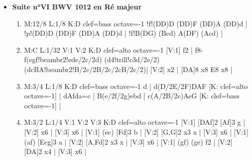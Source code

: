 \documentclass[a4paper,twoside]{article}
\begin{document}
\begin{center}
\begin{itemize}
  \item \textbf{Suite n°VI BWV 1012 en Ré majeur} \dotfill\ \pageref{SuiteVI}
\begin{enumerate}
  \item {}
\begin{abcsvg}
  M:12/8
  L:1/8
  K:D clef=bass octave=-1
  !f!(DD)D (DD)F (DD)A (DD)d |
  !p!(DD)D (DD)F (DD)A (DD)d |
  !f!B(DG) (Bcd) A(DF) (Acd) |
\end{abcsvg}
  \makebox[2cm][l]{ \dotfill\ \pageref{VIprelude}}
  \par\vspace{\titleseplen}

  \item {}
\begin{abcsvg}
  M:C
  L:1/32
  V:1
  V:2
  K:D clef=alto octave=-1
  [V:1] f2 | f8- f(egf!beambr2!ede/2c/2d) (d4!trill!c3d/2e/2) (dcBA!beambr2!B/2c/2B/2c/2cB/2c/2)|
  [V:2] x2 | [DA]8 x8             E8                    x8    |
\end{abcsvg}
  \makebox[2cm][l]{ \dotfill\ \pageref{VIallemande}}
  \par\vspace{\titleseplen}

  \item {}
\begin{abcsvg}
  M:3/4
  L:1/8
  K:D clef=bass octave=-1
  d | d(D/2E/2F)DAF [K: clef=alto octave=-1] |
  dAfda=c |
  B(e/2f/2g)ebd |
  c(A/2B/2c)AeG [K: clef=bass octave=-1] |
\end{abcsvg}
  \makebox[2cm][l]{ \dotfill\ \pageref{VIcourante}}
  \par\vspace{\titleseplen}

  \item {}
\begin{abcsvg}
  M:3/2
  L:1/4
  V:1
  V:2
  V:3
  K:D clef=alto octave=-1
  [V:1] [DAf]2 [Af]3 g |
  [V:2] x6 |
  [V:3] x6 |
  [V:1] (ec)   [Fd]3 b |
  [V:2] [G,G]2  x3 x |
  [V:3] x6 |
  [V:1] (af) [Ecg]3 a |
  [V:2] [A,Fd]2  x3 x |
  [V:3] x6 |
  [V:1] (gf) (ge) f2 |
  [V:2] [DA]2 x4 |
  [V:3] x6 |
\end{abcsvg}
  \makebox[2cm][l]{ \dotfill\ \pageref{VIsarabande}}
  \par\vspace{\titleseplen}


\end{enumerate}
\end{itemize}
\end{center}
\end{document}
